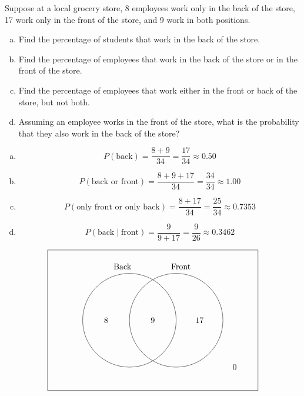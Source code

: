 \documentclass[11pt,letterpaper]{article}
\begin{document}

 Suppose at a local grocery store, 8 employees work only in the back of the store, 17 work only in the front of the store, and 9 work in both positions.
	\begin{enumerate}[(a)]
	\item Find the percentage of students that work in the back of the store.
	\item Find the percentage of employees that work in the back of the store or in the front of the store.
	\item Find the percentage of employees that work either in the front or back of the store, but not both. 
	\item Assuming an employee works in the front of the store, what is the probability that they also work in the back of the store?
	\end{enumerate} \pspace

\sol 
\begin{enumerate}[(a)]
\item 
	\[
	P(\text{back})= \dfrac{8 + 9}{34}= \dfrac{17}{34} \approx 0.50
	\]

\item 
	\[
	P(\text{back or front})= \dfrac{8 + 9 + 17}{34}= \dfrac{34}{34} \approx 1.00
	\]

\item 
	\[
	P(\text{only front or only back})= \dfrac{8 + 17}{34}= \dfrac{25}{34} \approx 0.7353
	\]

\item 
	\[
	P(\text{back} \;|\; \text{front})= \dfrac{9}{9 + 17}= \dfrac{9}{26} \approx 0.3462
	\]
\end{enumerate} \vfill

	\[
	\begin{tikzpicture}
	\draw (0,0) rectangle (9,6);
	\draw (3.5,3) circle (2);
	\draw (5.5,3) circle (2);
	
	\node at (3.2,5.3) {Back};
	\node at (5.7,5.3) {Front}; 
	
	\node at (2.5,3) {8};
	\node at (4.5,3) {9};
	\node at (6.5,3) {17};
	\node at (8,1) {0};
	\end{tikzpicture}
	\]



\newpage
\end{document}
